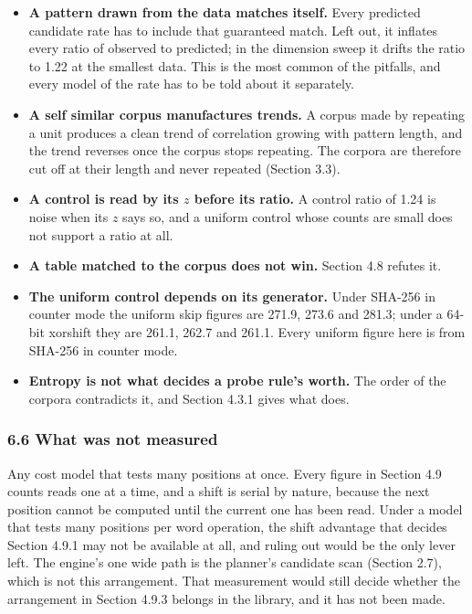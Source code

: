 \begin{itemize}
\item \textbf{A pattern drawn from the data matches itself.} Every predicted candidate rate has to include that guaranteed match. Left out, it inflates every ratio of observed to predicted; in the dimension sweep it drifts the ratio to 1.22 at the smallest data. This is the most common of the pitfalls, and every model of the rate has to be told about it separately.
\item \textbf{A self similar corpus manufactures trends.} A corpus made by repeating a unit produces a clean trend of correlation growing with pattern length, and the trend reverses once the corpus stops repeating. The corpora are therefore cut off at their length and never repeated (Section 3.3).
\item \textbf{A control is read by its \(z\) before its ratio.} A control ratio of 1.24 is noise when its \(z\) says so, and a uniform control whose counts are small does not support a ratio at all.
\item \textbf{A table matched to the corpus does not win.} Section 4.8 refutes it.
\item \textbf{The uniform control depends on its generator.} Under SHA-256 in counter mode the uniform skip figures are 271.9, 273.6 and 281.3; under a 64-bit xorshift they are 261.1, 262.7 and 261.1. Every uniform figure here is from SHA-256 in counter mode.
\item \textbf{Entropy is not what decides a probe rule's worth.} The order of the corpora contradicts it, and Section 4.3.1 gives what does.
\end{itemize}

\subsubsection{6.6 What was not measured}

Any cost model that tests many positions at once. Every figure in Section 4.9 counts reads one at a time, and a shift is serial by nature, because the next position cannot be computed until the current one has been read. Under a model that tests many positions per word operation, the shift advantage that decides Section 4.9.1 may not be available at all, and ruling out would be the only lever left. The engine's one wide path is the planner's candidate scan (Section 2.7), which is not this arrangement. That measurement would still decide whether the arrangement in Section 4.9.3 belongs in the library, and it has not been made.

